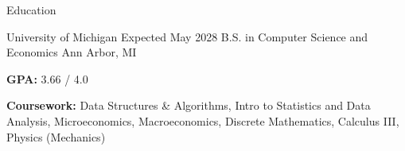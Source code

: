 \documentclass[
	11pt
]{../../../template}
\begin{document}
	\begin{rSection}{E}{ducation}
		\begin{rSectionEntry}
			{University of Michigan}
			{Expected May 2028}
			{B.S. in Computer Science and Economics}
			{}
			{Ann Arbor, MI}

			\item \textbf{GPA:} 3.66 / 4.0
			\item \textbf{Coursework:} Data Structures \& Algorithms, Intro to Statistics and Data Analysis, Microeconomics, Macroeconomics, Discrete Mathematics, Calculus III, Physics (Mechanics)
		\end{rSectionEntry}
	\end{rSection}

\end{document}
